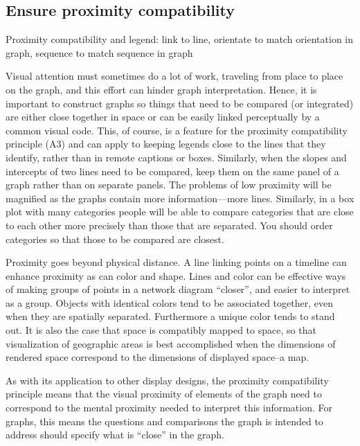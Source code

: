 \documentclass[]{krantz}
\begin{document}
\hypertarget{ensure-proximity-compatibility}{%
\subsection{Ensure proximity compatibility}\label{ensure-proximity-compatibility}}

Proximity compatibility and legend: link to line, orientate to match orientation in graph, sequence to match sequence in graph

Visual attention must sometimes do a lot of work, traveling from place to place on the graph, and this effort can hinder graph interpretation. Hence, it is important to construct graphs so things that need to be compared (or integrated) are either close together in space or can be easily linked perceptually by a common visual code. This, of course, is a feature for the proximity compatibility principle (A3) and can apply to keeping legends close to the lines that they identify, rather than in remote captions or boxes. Similarly, when the slopes and intercepts of two lines need to be compared, keep them on the same panel of a graph rather than on separate panels. The problems of low proximity will be magnified as the graphs contain more information---more lines. Similarly, in a box plot with many categories people will be able to compare categories that are close to each other more precisely than those that are separated. You should order categories so that those to be compared are closest.

Proximity goes beyond physical distance. A line linking points on a timeline can enhance proximity as can color and shape. Lines and color can be effective ways of making groups of points in a network diagram ``closer'', and easier to interpret as a group. Objects with identical colors tend to be associated together, even when they are spatially separated. Furthermore a unique color tends to stand out. It is also the case that space is compatibly mapped to space, so that visualization of geographic areas is best accomplished when the dimensions of rendered space correspond to the dimensions of displayed space--a map.

As with its application to other display designs, the proximity compatibility principle means that the visual proximity of elements of the graph need to correspond to the mental proximity needed to interpret this information. For graphs, this means the questions and comparisons the graph is intended to address should specify what is ``close'' in the graph.
\end{document}
